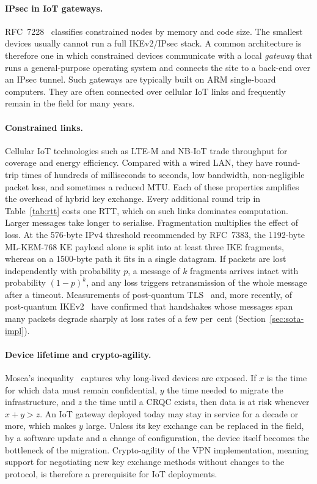 \paragraph{IPsec in IoT gateways.}
RFC~7228~\cite{rfc7228} classifies constrained nodes by memory and code size.
The smallest devices usually cannot run a full IKEv2/IPsec stack. A common
architecture is therefore one in which constrained devices communicate with
a local \emph{gateway} that runs a general-purpose operating system and
connects the site to a back-end over an IPsec tunnel. Such gateways are
typically built on ARM single-board computers. They are often connected over
cellular IoT links and frequently remain in the field for many years.

\paragraph{Constrained links.}
Cellular IoT technologies such as LTE-M and NB-IoT trade throughput for
coverage and energy efficiency. Compared with a wired LAN, they have
round-trip times of hundreds of milliseconds to seconds, low bandwidth,
non-negligible packet loss, and sometimes a reduced MTU.
Each of these properties amplifies the overhead of hybrid key exchange.
Every additional round trip in Table~\ref{tab:rtt} costs one RTT, which on
such links dominates computation. Larger messages take longer to serialise.
Fragmentation multiplies the effect of loss. At the 576-byte IPv4 threshold
recommended by RFC~7383, the 1192-byte ML-KEM-768 KE payload alone is split
into at least three IKE fragments, whereas on a 1500-byte path it fits in
a single datagram. If packets are lost independently with probability $p$,
a message of $k$ fragments arrives intact with probability $(1-p)^k$, and any
loss triggers retransmission of the whole message after a timeout.
Measurements of post-quantum TLS~\cite{paquin2020} and, more recently, of
post-quantum IKEv2~\cite{twardokus2025,rahul2026} have confirmed that
handshakes whose messages span many packets degrade sharply at loss rates of
a few per~cent (Section~\ref{sec:sota-impl}).

\paragraph{Device lifetime and crypto-agility.}
Mosca's inequality~\cite{mosca2018} captures why long-lived devices are
exposed. If $x$ is the time for which data must remain confidential, $y$ the
time needed to migrate the infrastructure, and $z$ the time until a CRQC
exists, then data is at risk whenever $x + y > z$. An IoT gateway deployed today
may stay in service for a decade or more, which makes $y$ large. Unless its
key exchange can be replaced in the field, by a software update and a change of
configuration, the device itself becomes the bottleneck of the migration.
Crypto-agility of the VPN implementation, meaning support for negotiating new
key exchange methods without changes to the protocol, is therefore
a prerequisite for IoT deployments.

